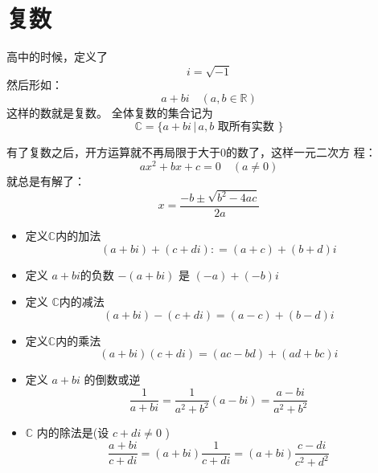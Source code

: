 \documentclass[13pt,fontset=mac]{ctexbeamer}
\begin{document}
%




\section{复数}
\begin{frame}
	高中的时候，定义了
	\[
	i=\sqrt{-1}
	\]
	然后形如：
	\[
	a+b i \quad(a, b \in \mathbb{R})
	\]
	这样的数就是复数。
	全体复数的集合记为
	\[
	\mathbb{C}=\{a+b i \, | \, a, b \text { 取所有实数 }\}
	\]
	
	
	有了复数之后，开方运算就不再局限于大于0的数了，这样一元二次方 程：
	\[
	a x^{2}+b x+c=0 \quad(a \neq 0)
	\]
	就总是有解了：
	\[
	x=\frac{-b \pm \sqrt{b^{2}-4 a c}}{2 a}
	\]
	
	
\end{frame}

\begin{frame}
	\begin{itemize}
		\item 定义$\mathbb{C}$内的加法
		$$(a+b i)+(c+d i)  : =(a+c)+(b+d) i $$
		
		\item 定义 $a+b {i}$的负数 $-(a+b {i})${ 是 } $(-a)+(-b) {i}$
		
		\item 定义  $\mathbb{C}$内的减法 $$(a+b i)-(c+d i) =(a-c)+(b-d) i $$
	\end{itemize}
	
\end{frame}

\begin{frame}
	\begin{itemize}
		\item 定义$\mathbb{C}$内的乘法
		\[
		(a+b i)(c+d i) =(a c-b d)+(a d+b c) i
		\]
		
		\item 定义 $a+b {i}$ 的倒数或逆
		\[
		\frac{1}{a+b i}=\frac{1}{a^{2}+b^{2}}(a-b i)=\frac{a-b i}{a^{2}+b^{2}}
		\]
		\item  $\mathbb{C}$ 内的除法是(设 $c+d {i} \neq 0$ )
		\[
		\frac{a+b i}{c+d i}=(a+b i) \frac{1}{c+d i}=(a+b i) \frac{c-d i}{c^{2}+d^{2}}
		\]
	\end{itemize}
\end{frame}
\end{document}
